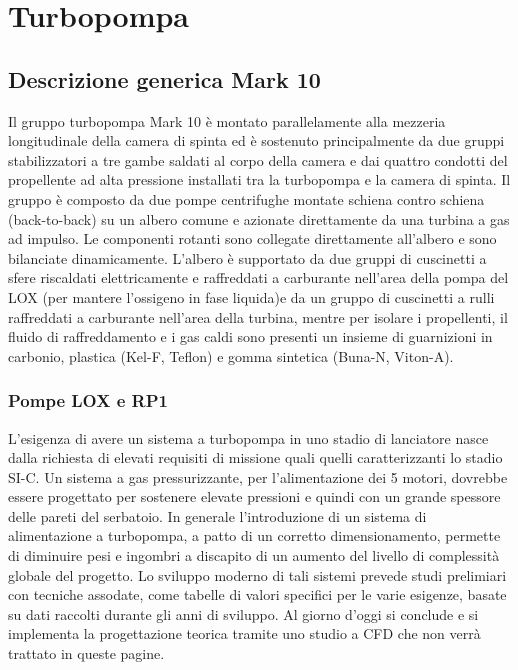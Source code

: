 \section{Turbopompa}
\label{sec:turbopompa}

\subsection{Descrizione generica Mark 10}
\label{subsec:descrizione mark 10}

Il gruppo turbopompa Mark 10 è montato parallelamente alla mezzeria longitudinale della camera di spinta ed è sostenuto principalmente da due gruppi stabilizzatori a tre gambe saldati al corpo della camera e dai quattro condotti del propellente ad alta pressione installati tra la turbopompa e la camera di spinta. 
Il gruppo è composto da due pompe centrifughe montate schiena contro schiena (back-to-back) su un albero comune e azionate direttamente da una turbina a gas ad impulso.
Le componenti rotanti sono collegate direttamente all'albero e sono bilanciate dinamicamente.
L'albero è supportato da due gruppi di cuscinetti a sfere riscaldati elettricamente e raffreddati a carburante nell'area della pompa del LOX (per mantere l'ossigeno in fase liquida)e da un gruppo di cuscinetti a rulli raffreddati a carburante nell'area della turbina, mentre per isolare i propellenti, il fluido di raffreddamento e i gas caldi sono presenti un insieme di guarnizioni in carbonio, plastica (Kel-F, Teflon) e gomma sintetica (Buna-N, Viton-A).

\subsubsection{Pompe LOX e RP1}

L'esigenza di avere un sistema a turbopompa in uno stadio di lanciatore nasce dalla richiesta di elevati requisiti di missione quali quelli caratterizzanti lo stadio SI-C. Un sistema a gas pressurizzante, per l'alimentazione dei 5 motori, dovrebbe essere progettato per sostenere elevate pressioni e quindi con un grande spessore delle pareti del serbatoio. In generale l'introduzione di un sistema di alimentazione a turbopompa, a patto di un corretto dimensionamento, permette di diminuire pesi e ingombri a discapito di un aumento del livello di complessità globale del progetto. Lo sviluppo moderno di tali sistemi prevede studi prelimiari con tecniche assodate, come tabelle di valori specifici per le varie esigenze, basate su dati raccolti durante gli anni di sviluppo. Al giorno d'oggi si conclude e si implementa la progettazione teorica tramite uno studio a CFD che non verrà trattato in queste pagine. 


